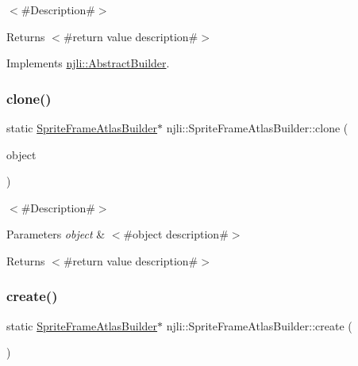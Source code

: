 $<$\#\+Description\#$>$

\begin{DoxyReturn}{Returns}
$<$\#return value description\#$>$ 
\end{DoxyReturn}


Implements \mbox{\hyperlink{classnjli_1_1_abstract_builder_aa1d220053e182c37b31b427499c6eacf}{njli\+::\+Abstract\+Builder}}.

\mbox{\label{classnjli_1_1_sprite_frame_atlas_builder_ab67505f778002fc04c16abc632a67647}} 
\subsubsection{\texorpdfstring{clone()}{clone()}}
{\footnotesize\ttfamily static \mbox{\hyperlink{classnjli_1_1_sprite_frame_atlas_builder}{Sprite\+Frame\+Atlas\+Builder}}$\ast$ njli\+::\+Sprite\+Frame\+Atlas\+Builder\+::clone (\begin{DoxyParamCaption}\item[{const \mbox{\hyperlink{classnjli_1_1_sprite_frame_atlas_builder}{Sprite\+Frame\+Atlas\+Builder}} \&}]{object }\end{DoxyParamCaption})\hspace{0.3cm}{\ttfamily [static]}}

$<$\#\+Description\#$>$


\begin{DoxyParams}{Parameters}
{\em object} & $<$\#object description\#$>$\\
\hline
\end{DoxyParams}
\begin{DoxyReturn}{Returns}
$<$\#return value description\#$>$ 
\end{DoxyReturn}
\mbox{\label{classnjli_1_1_sprite_frame_atlas_builder_ad4e9ac86b040e0e7213f548325a1d420}} 
\subsubsection{\texorpdfstring{create()}{create()}}
{\footnotesize\ttfamily static \mbox{\hyperlink{classnjli_1_1_sprite_frame_atlas_builder}{Sprite\+Frame\+Atlas\+Builder}}$\ast$ njli\+::\+Sprite\+Frame\+Atlas\+Builder\+::create (\begin{DoxyParamCaption}{ }\end{DoxyParamCaption})\hspace{0.3cm}{\ttfamily [static]}}

